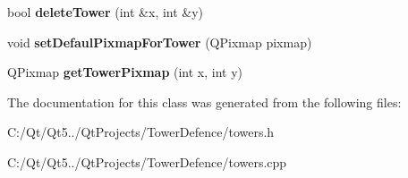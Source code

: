 \begin{DoxyCompactItemize}
\item 
\hypertarget{class_towers_abd58ccdc22e26b8014dcad2dc0701a25}{}bool {\bfseries delete\+Tower} (int \&x, int \&y)\label{class_towers_abd58ccdc22e26b8014dcad2dc0701a25}

\item 
\hypertarget{class_towers_a61337d1470e979c11da89cae7ae0c579}{}void {\bfseries set\+Defaul\+Pixmap\+For\+Tower} (Q\+Pixmap pixmap)\label{class_towers_a61337d1470e979c11da89cae7ae0c579}

\item 
\hypertarget{class_towers_ab6961224a1c041dd89f5be2fdd1d1391}{}Q\+Pixmap {\bfseries get\+Tower\+Pixmap} (int x, int y)\label{class_towers_ab6961224a1c041dd89f5be2fdd1d1391}

\end{DoxyCompactItemize}


The documentation for this class was generated from the following files\+:\begin{DoxyCompactItemize}
\item 
C\+:/\+Qt/\+Qt5../\+Qt\+Projects/\+Tower\+Defence/towers.\+h\item 
C\+:/\+Qt/\+Qt5../\+Qt\+Projects/\+Tower\+Defence/towers.\+cpp\end{DoxyCompactItemize}
